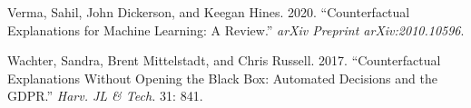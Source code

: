 \documentclass[
  sigconf]{acmart}
\newlength{\cslhangindent}
\newlength{\cslentryspacingunit} %
\newenvironment{CSLReferences}[2] %
 {%
  \setlength{\parindent}{0pt}
  \ifodd #1
  \let\oldpar\par
  \def\par{\hangindent=\cslhangindent\oldpar}
  \fi
  \setlength{\parskip}{#2\cslentryspacingunit}
 }%
 {}
\begin{document}
\begin{CSLReferences}{1}{0}
\leavevmode{}%
Verma, Sahil, John Dickerson, and Keegan Hines. 2020. {``Counterfactual
Explanations for Machine Learning: A Review.''} \emph{arXiv Preprint
arXiv:2010.10596}.

\leavevmode{}%
Wachter, Sandra, Brent Mittelstadt, and Chris Russell. 2017.
{``Counterfactual Explanations Without Opening the Black Box: Automated
Decisions and the GDPR.''} \emph{Harv. JL \& Tech.} 31: 841.

\end{CSLReferences}
\end{document}

